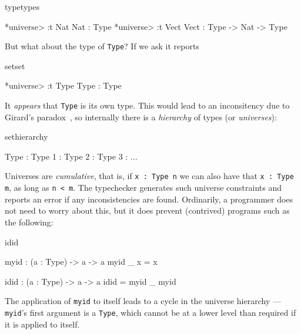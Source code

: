 \begin{SaveVerbatim}{typetypes}

*universe> :t Nat
Nat : Type
*universe> :t Vect
Vect : Type -> Nat -> Type

\end{SaveVerbatim}

\noindent
But what about the type of \texttt{Type}? If we ask \Idris{} it reports

\begin{SaveVerbatim}{setset}

*universe> :t Type
Type : Type

\end{SaveVerbatim}

\noindent
It \emph{appears} that \texttt{Type} is its own type. This would lead to an inconsitency
due to Girard's paradox~\cite{girard-thesis}, so internally there is a \emph{hierarchy}
of types (or \emph{universes}):

\begin{SaveVerbatim}{sethierarchy}

Type : Type 1 : Type 2 : Type 3 : ...

\end{SaveVerbatim}

\noindent
Universes are \emph{cumulative}, that is, if \texttt{x : Type n} we can also have that
\texttt{x : Type m}, as long as \texttt{n < m}. 
The typechecker generates such universe 
constraints and reports an error if any inconsistencies are found. Ordinarily, a
programmer does not need to worry about this, but it does prevent (contrived)
programs such as the following:

\begin{SaveVerbatim}{idid}

myid : (a : Type) -> a -> a
myid _ x = x

idid :  (a : Type) -> a -> a
idid = myid _ myid

\end{SaveVerbatim}

\noindent
The application of \texttt{myid} to itself leads to a cycle in the universe hierarchy
--- \texttt{myid}'s first argument is a \texttt{Type}, which cannot be at a lower level
than required if it is applied to itself.


